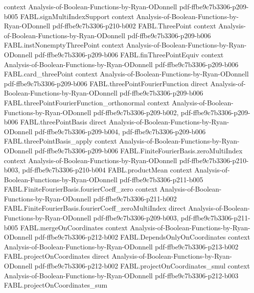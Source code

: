 \begin{theorem}
  {context}
  {Analysis-of-Boolean-Functions-by-Ryan-ODonnell}
  {pdf-ffbe9c7b3306-p209-b005}
\proofstep
  {FABL.signMultiIndexSupport}
  {context}
  {Analysis-of-Boolean-Functions-by-Ryan-ODonnell}
  {pdf-ffbe9c7b3306-p210-b002}
\proofstep
  {FABL.ThreePoint}
  {context}
  {Analysis-of-Boolean-Functions-by-Ryan-ODonnell}
  {pdf-ffbe9c7b3306-p209-b006}
\proofstep
  {FABL.instNonemptyThreePoint}
  {context}
  {Analysis-of-Boolean-Functions-by-Ryan-ODonnell}
  {pdf-ffbe9c7b3306-p209-b006}
\proofstep
  {FABL.finThreePointEquiv}
  {context}
  {Analysis-of-Boolean-Functions-by-Ryan-ODonnell}
  {pdf-ffbe9c7b3306-p209-b006}
\proofstep
  {FABL.card_threePoint}
  {context}
  {Analysis-of-Boolean-Functions-by-Ryan-ODonnell}
  {pdf-ffbe9c7b3306-p209-b006}
\proofstep
  {FABL.threePointFourierFunction}
  {direct}
  {Analysis-of-Boolean-Functions-by-Ryan-ODonnell}
  {pdf-ffbe9c7b3306-p209-b006}
\proofstep
  {FABL.threePointFourierFunction_orthonormal}
  {context}
  {Analysis-of-Boolean-Functions-by-Ryan-ODonnell}
  {pdf-ffbe9c7b3306-p209-b002,
    pdf-ffbe9c7b3306-p209-b006}
\proofstep
  {FABL.threePointBasis}
  {direct}
  {Analysis-of-Boolean-Functions-by-Ryan-ODonnell}
  {pdf-ffbe9c7b3306-p209-b004,
    pdf-ffbe9c7b3306-p209-b006}
\proofstep
  {FABL.threePointBasis_apply}
  {context}
  {Analysis-of-Boolean-Functions-by-Ryan-ODonnell}
  {pdf-ffbe9c7b3306-p209-b006}
\proofstep
  {FABL.FiniteFourierBasis.zeroMultiIndex}
  {context}
  {Analysis-of-Boolean-Functions-by-Ryan-ODonnell}
  {pdf-ffbe9c7b3306-p210-b003,
    pdf-ffbe9c7b3306-p210-b004}
\proofstep
  {FABL.productMean}
  {context}
  {Analysis-of-Boolean-Functions-by-Ryan-ODonnell}
  {pdf-ffbe9c7b3306-p211-b005}
\proofstep
  {FABL.FiniteFourierBasis.fourierCoeff_zero}
  {context}
  {Analysis-of-Boolean-Functions-by-Ryan-ODonnell}
  {pdf-ffbe9c7b3306-p211-b002}
\proofstep
  {FABL.FiniteFourierBasis.fourierCoeff_zeroMultiIndex}
  {direct}
  {Analysis-of-Boolean-Functions-by-Ryan-ODonnell}
  {pdf-ffbe9c7b3306-p209-b003,
    pdf-ffbe9c7b3306-p211-b005}
\proofstep
  {FABL.mergeOnCoordinates}
  {context}
  {Analysis-of-Boolean-Functions-by-Ryan-ODonnell}
  {pdf-ffbe9c7b3306-p212-b002}
\proofstep
  {FABL.DependsOnlyOnCoordinates}
  {context}
  {Analysis-of-Boolean-Functions-by-Ryan-ODonnell}
  {pdf-ffbe9c7b3306-p213-b002}
\proofstep
  {FABL.projectOnCoordinates}
  {direct}
  {Analysis-of-Boolean-Functions-by-Ryan-ODonnell}
  {pdf-ffbe9c7b3306-p212-b002}
\proofstep
  {FABL.projectOnCoordinates_smul}
  {context}
  {Analysis-of-Boolean-Functions-by-Ryan-ODonnell}
  {pdf-ffbe9c7b3306-p212-b003}
\proofstep
  {FABL.projectOnCoordinates_sum}

\end{theorem}
